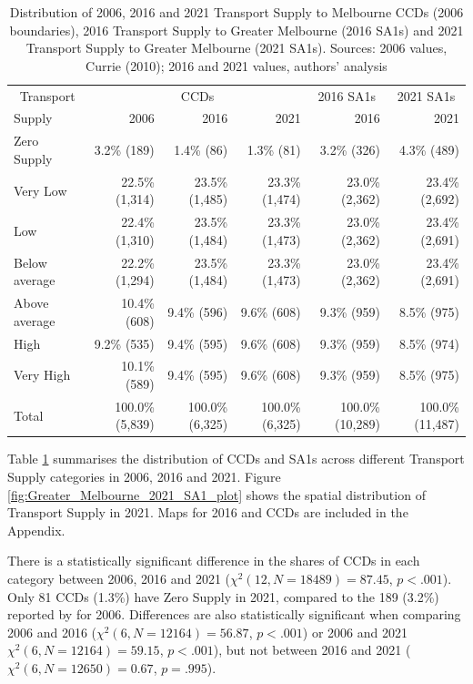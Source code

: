 \documentclass[preprint, 3p,
authoryear]{elsarticle} %
\begin{document}
\begin{longtable}[t]{lrrrrr}
\caption{\label{tab:Greater_Melbourne_CCDs_SA1_table}Distribution of 2006, 2016 and 2021 Transport Supply to Melbourne CCDs (2006 boundaries), 2016 Transport Supply to Greater Melbourne (2016 SA1s) and 2021 Transport Supply to Greater Melbourne (2021 SA1s). Sources: 2006 values, Currie (2010); 2016 and 2021 values, authors' analysis}\\
\toprule
\multicolumn{1}{c}{Transport} & \multicolumn{3}{c}{CCDs} & \multicolumn{1}{c}{2016 SA1s} & \multicolumn{1}{c}{2021 SA1s} \\
\cmidrule(l{3pt}r{3pt}){1-1} \cmidrule(l{3pt}r{3pt}){2-4} \cmidrule(l{3pt}r{3pt}){5-5} \cmidrule(l{3pt}r{3pt}){6-6}
Supply & 2006 & 2016 & 2021 & 2016 & 2021\\
\midrule
Zero Supply & 3.2\%   (189) & 1.4\%    (86) & 1.3\%    (81) & 3.2\%    (326) & 4.3\%    (489)\\
Very Low & 22.5\% (1,314) & 23.5\% (1,485) & 23.3\% (1,474) & 23.0\%  (2,362) & 23.4\%  (2,692)\\
Low & 22.4\% (1,310) & 23.5\% (1,484) & 23.3\% (1,473) & 23.0\%  (2,362) & 23.4\%  (2,691)\\
Below average & 22.2\% (1,294) & 23.5\% (1,484) & 23.3\% (1,473) & 23.0\%  (2,362) & 23.4\%  (2,691)\\
Above average & 10.4\%   (608) & 9.4\%   (596) & 9.6\%   (608) & 9.3\%    (959) & 8.5\%    (975)\\
\addlinespace
High & 9.2\%   (535) & 9.4\%   (595) & 9.6\%   (608) & 9.3\%    (959) & 8.5\%    (974)\\
Very High & 10.1\%   (589) & 9.4\%   (595) & 9.6\%   (608) & 9.3\%    (959) & 8.5\%    (975)\\
Total & 100.0\% (5,839) & 100.0\% (6,325) & 100.0\% (6,325) & 100.0\% (10,289) & 100.0\% (11,487)\\
\bottomrule
\end{longtable}

Table \ref{tab:Greater_Melbourne_CCDs_SA1_table} summarises the
distribution of CCDs and SA1s across different Transport Supply
categories in 2006, 2016 and 2021. Figure
\ref{fig:Greater_Melbourne_2021_SA1_plot} shows the spatial distribution
of Transport Supply in 2021. Maps for 2016 and CCDs are included in the
Appendix.

There is a statistically significant difference in the shares of CCDs in
each category between 2006, 2016 and 2021
(\(\chi^2(12, N = 18489) = 87.45\), \(p < .001\)). Only 81 CCDs (1.3\%)
have Zero Supply in 2021, compared to the 189 (3.2\%) reported by
\citet{currie2010identifying} for 2006. Differences are also
statistically significant when comparing 2006 and 2016
(\(\chi^2(6, N = 12164) = 56.87\), \(p < .001\)) or 2006 and 2021
\(\chi^2(6, N = 12164) = 59.15\), \(p < .001\)), but not between 2016
and 2021 (\(\chi^2(6, N = 12650) = 0.67\), \(p = .995\)).
\end{document}
